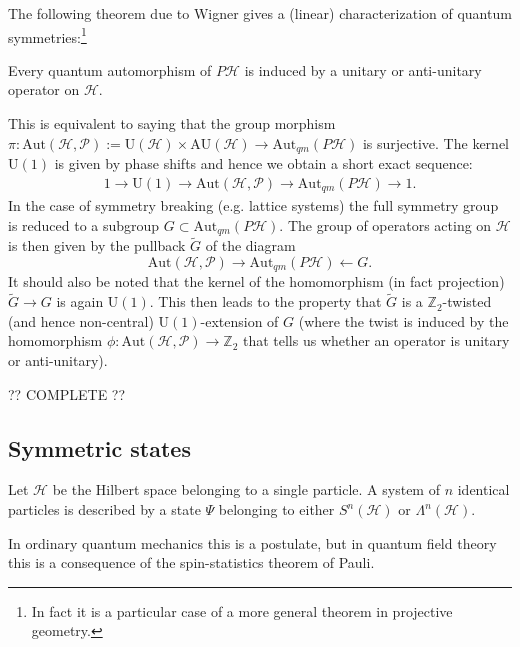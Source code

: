     The following theorem due to Wigner gives a (linear) characterization of quantum symmetries:\footnote{In fact it is a particular case of a more general theorem in projective geometry.}
    \begin{theorem}[Wigner]
        Every quantum automorphism of $P\mathcal{H}$ is induced by a unitary or anti-unitary operator on $\mathcal{H}$.
    \end{theorem}
    This is equivalent to saying that the group morphism $\pi:\text{Aut}(\mathcal{H}, \mathcal{P}):=\text{U}(\mathcal{H})\times\text{AU}(\mathcal{H})\rightarrow\text{Aut}_{qm}(P\mathcal{H})$ is surjective. The kernel $\text{U}(1)$ is given by phase shifts and hence we obtain a short exact sequence:
    \begin{gather}
        1\longrightarrow\text{U}(1)\longrightarrow\text{Aut}(\mathcal{H}, \mathcal{P})\longrightarrow\text{Aut}_{qm}(P\mathcal{H})\longrightarrow1.
    \end{gather}
    In the case of symmetry breaking (e.g. lattice systems) the full symmetry group is reduced to a subgroup $G\subset\text{Aut}_{qm}(P\mathcal{H})$. The group of operators acting on $\mathcal{H}$ is then given by the pullback $\widetilde{G}$ of the diagram \[\text{Aut}(\mathcal{H}, \mathcal{P})\longrightarrow\text{Aut}_{qm}(P\mathcal{H})\longleftarrow G.\] It should also be noted that the kernel of the homomorphism (in fact projection) $\widetilde{G}\rightarrow G$ is again $\text{U}(1)$. This then leads to the property that $\widetilde{G}$ is a $\mathbb{Z}_2$-twisted (and hence non-central) $\text{U}(1)$-extension of $G$ (where the twist is induced by the homomorphism $\phi:\text{Aut}(\mathcal{H}, \mathcal{P})\rightarrow\mathbb{Z}_2$ that tells us whether an operator is unitary or anti-unitary).

    ?? COMPLETE ??

\subsection{Symmetric states}

    \begin{axiom}
        Let $\mathcal{H}$ be the Hilbert space belonging to a single particle. A system of $n$ identical particles is described by a state $\Psi$ belonging to either $S^n(\mathcal{H})$ or $\Lambda^n(\mathcal{H})$.
    \end{axiom}
    \begin{remark}
        In ordinary quantum mechanics this is a postulate, but in quantum field theory this is a consequence of the spin-statistics theorem of Pauli.
    \end{remark}

